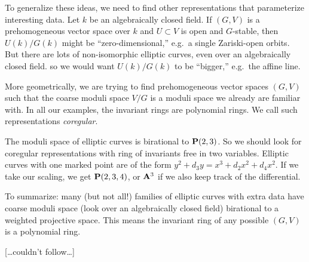 To generalize these ideas, we need to find other representations that 
parameterize interesting data. Let $k$ be an algebraically closed field. If 
$(G,V)$ is a prehomogeneous vector space over $k$ and $U\subset V$ is open and 
$G$-stable, then $U(k)/G(k)$ might be ``zero-dimensional,'' e.g.~a single 
Zariski-open orbits. But there are lots of non-isomorphic elliptic curves, 
even over an algebraically closed field. so we would want 
$U(k)/G(k)$ to be ``bigger,'' e.g.~the affine line. 

More geometrically, we are trying to find prehomogeneous vector spaces 
$(G,V)$ such that the coarse moduli space $V/G$ is a moduli space we already 
are familiar with. In all our examples, the invariant rings are polynomial 
rings. We call such representations \emph{coregular}. 

The moduli space of elliptic curves is birational to $\mathbf{P}(2,3)$. So we should 
look for coregular representations with ring of invariants free in two 
variables. Elliptic curves with one marked point are of the form 
$y^2 + d_3 y = x^3 + d_2 x^2 + d_4 x^2$. If we take our scaling, we get 
$\mathbf{P}(2,3,4)$, or $\mathbf{A}^3$ if we also keep track of the differential. 

To summarize: many (but not all!) families of elliptic curves with extra data 
have coarse moduli space (look over an algebraically closed field) birational 
to a weighted projective space. This means the invariant ring of any possible 
$(G,V)$ is a polynomial ring. 

[\ldots couldn't follow\ldots]




